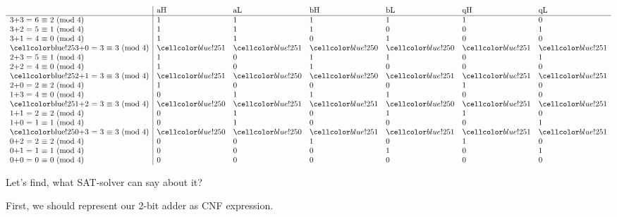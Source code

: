 \begin{center}
\begin{doublespace}
\noindent\(\begin{array}{l|llllll}
  & \text{aH} & \text{aL} & \text{bH} & \text{bL} & \text{qH} & \text{qL} \\
\hline
 \text{3+3 = 6 $\equiv $ 2 (mod 4)} & 1 & 1 & 1 & 1 & 1 & 0 \\
 \text{3+2 = 5 $\equiv $ 1 (mod 4)} & 1 & 1 & 1 & 0 & 0 & 1 \\
 \text{3+1 = 4 $\equiv $ 0 (mod 4)} & 1 & 1 & 0 & 1 & 0 & 0 \\
 \text{\HLcell{}3+0 = 3 $\equiv $ 3 (mod 4)} & \HLcell{}1 & \HLcell{}1 & \HLcell{}0 & \HLcell{}0 & \HLcell{}1 & \HLcell{}1 \\
 \text{2+3 = 5 $\equiv $ 1 (mod 4)} & 1 & 0 & 1 & 1 & 0 & 1 \\
 \text{2+2 = 4 $\equiv $ 0 (mod 4)} & 1 & 0 & 1 & 0 & 0 & 0 \\
 \text{\HLcell{}2+1 = 3 $\equiv $ 3 (mod 4)} & \HLcell{}1 & \HLcell{}0 & \HLcell{}0 & \HLcell{}1 & \HLcell{}1 & \HLcell{}1 \\
 \text{2+0 = 2 $\equiv $ 2 (mod 4)} & 1 & 0 & 0 & 0 & 1 & 0 \\
 \text{1+3 = 4 $\equiv $ 0 (mod 4)} & 0 & 1 & 1 & 1 & 0 & 0 \\
 \text{\HLcell{}1+2 = 3 $\equiv $ 3 (mod 4)} & \HLcell{}0 & \HLcell{}1 & \HLcell{}1 & \HLcell{}0 & \HLcell{}1 & \HLcell{}1 \\
 \text{1+1 = 2 $\equiv $ 2 (mod 4)} & 0 & 1 & 0 & 1 & 1 & 0 \\
 \text{1+0 = 1 $\equiv $ 1 (mod 4)} & 0 & 1 & 0 & 0 & 0 & 1 \\
 \text{\HLcell{}0+3 = 3 $\equiv $ 3 (mod 4)} & \HLcell{}0 & \HLcell{}0 & \HLcell{}1 & \HLcell{}1 & \HLcell{}1 & \HLcell{}1 \\
 \text{0+2 = 2 $\equiv $ 2 (mod 4)} & 0 & 0 & 1 & 0 & 1 & 0 \\
 \text{0+1 = 1 $\equiv $ 1 (mod 4)} & 0 & 0 & 0 & 1 & 0 & 1 \\
 \text{0+0 = 0 $\equiv $ 0 (mod 4)} & 0 & 0 & 0 & 0 & 0 & 0 \\
\end{array}\)
\end{doublespace}
\end{center}

Let's find, what \ac{SAT}-solver can say about it?

First, we should represent our 2-bit adder as CNF expression.

